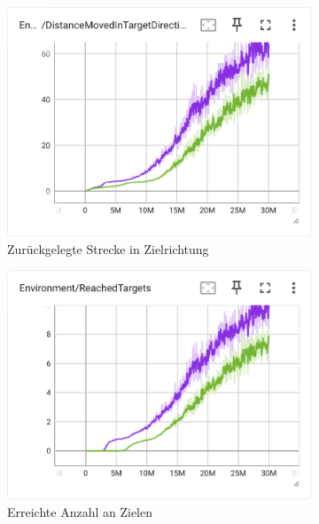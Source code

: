 \begin{figure}[H]
  \centering  
    \begin{subfigure}{.49\textwidth}
      \centering  
      \includegraphics[width=\textwidth]{img/104_105_move_target_dir}
      \caption{Zurückgelegte Strecke in Zielrichtung}
      \label{fig:104_105_move_target_dir}
    \end{subfigure}
    \begin{subfigure}{.49\textwidth}
      \centering  
      \includegraphics[width=\textwidth]{img/104_105_reach_target}
      \caption{Erreichte Anzahl an Zielen}
      \label{fig:104_105_reach_target}
    \end{subfigure}
    \begin{subfigure}{.49\textwidth}

\end{subfigure}
\end{figure}
